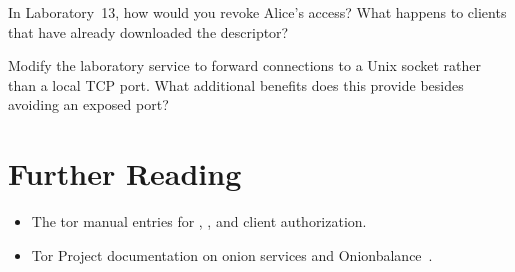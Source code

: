 \begin{esercizio}[2]\label{es:21-revoca}
In Laboratory~13, how would you revoke Alice's access? What happens to clients that have already downloaded the descriptor?
\end{esercizio}

\begin{esercizio}[3]\label{es:21-socket}
Modify the laboratory service to forward connections to a Unix socket rather than a local TCP port. What additional benefits does this provide besides avoiding an exposed port?
\end{esercizio}

\section*{Further Reading}
\begin{itemize}
  \item The tor manual entries for , , and client authorization.
  \item Tor Project documentation on onion services and Onionbalance~\cite{onionbalance}.
\end{itemize}
